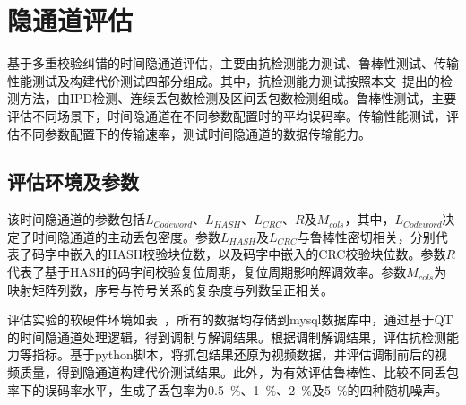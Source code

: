\section{隐通道评估}
\label{chap:hash:result}

基于多重校验纠错的时间隐通道评估，主要由抗检测能力测试、鲁棒性测试、传输性能测试及构建代价测试四部分组成。其中，抗检测能力测试按照本文\ 提出的检测方法，由IPD检测、连续丢包数检测及区间丢包数检测组成。鲁棒性测试，主要评估不同场景下，时间隐通道在不同参数配置时的平均误码率。传输性能测试，评估不同参数配置下的传输速率，测试时间隐通道的数据传输能力。

\subsection{评估环境及参数}
\label{chap:hash:result:parameters}

该时间隐通道的参数包括$L_{Codeword}$、$L_{HASH}$、$L_{CRC}$、$R$及$M_{cols}$，其中，$L_{Codeword}$决定了时间隐通道的主动丢包密度。参数$L_{HASH}$及$L_{CRC}$与鲁棒性密切相关，分别代表了码字中嵌入的HASH校验块位数，以及码字中嵌入的CRC校验块位数。参数$R$代表了基于HASH的码字间校验复位周期，复位周期影响解调效率。参数$M_{cols}$为映射矩阵列数，序号与符号关系的复杂度与列数呈正相关。


评估实验的软硬件环境如表\ ，所有的数据均存储到mysql数据库中，通过基于QT的时间隐通道处理逻辑，得到调制与解调结果。根据调制解调结果，评估抗检测能力等指标。基于python脚本，将抓包结果还原为视频数据，并评估调制前后的视频质量，得到隐通道构建代价测试结果。此外，为有效评估鲁棒性、比较不同丢包率下的误码率水平，生成了丢包率为0.5\ \%、1\ \%、2\ \%及5\ \%的四种随机噪声。


